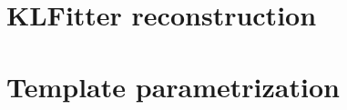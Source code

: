 \chapter{KLFitter reconstruction}
\label{sec:app0}


%

\chapter{Template parametrization}

\label{sec:apptem}






